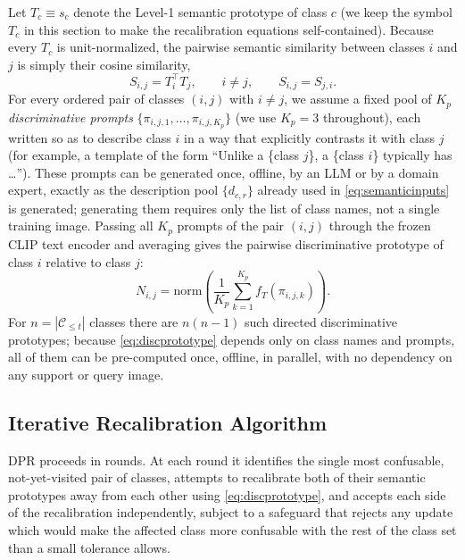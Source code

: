 \documentclass{iutbscthesis}
\begin{document}
Let $T_c \equiv s_c$ denote the Level-1 semantic prototype of class $c$ (we keep the symbol $T_c$ in this section to make the recalibration equations self-contained). Because every $T_c$ is unit-normalized, the pairwise semantic similarity between classes $i$ and $j$ is simply their cosine similarity,
\begin{equation}
    S_{i,j} = T_i^\top T_j, \qquad i \ne j, \qquad S_{i,j} = S_{j,i}.
    \label{eq:dprsim}
\end{equation}
For every ordered pair of classes $(i,j)$ with $i \ne j$, we assume a fixed pool of $K_p$ \emph{discriminative prompts} $\{\pi_{i,j,1}, \dots, \pi_{i,j,K_p}\}$ (we use $K_p = 3$ throughout), each written so as to describe class $i$ in a way that explicitly contrasts it with class $j$ (for example, a template of the form ``Unlike a \{class $j$\}, a \{class $i$\} typically has \dots''). These prompts can be generated once, offline, by an LLM or by a domain expert, exactly as the description pool $\{d_{c,r}\}$ already used in \autoref{eq:semanticinputs} is generated; generating them requires only the list of class names, not a single training image. Passing all $K_p$ prompts of the pair $(i,j)$ through the frozen CLIP text encoder and averaging gives the pairwise discriminative prototype of class $i$ relative to class $j$:
\begin{equation}
    N_{i,j} = \mathrm{norm}\!\left(\frac{1}{K_p}\sum_{k=1}^{K_p} f_T(\pi_{i,j,k})\right).
    \label{eq:discprototype}
\end{equation}
For $n = |\mathcal{C}_{\le t}|$ classes there are $n(n-1)$ such directed discriminative prototypes; because \autoref{eq:discprototype} depends only on class names and prompts, all of them can be pre-computed once, offline, in parallel, with no dependency on any support or query image.

\subsection{Iterative Recalibration Algorithm}

DPR proceeds in rounds. At each round it identifies the single most confusable, not-yet-visited pair of classes, attempts to recalibrate both of their semantic prototypes away from each other using \autoref{eq:discprototype}, and accepts each side of the recalibration independently, subject to a safeguard that rejects any update which would make the affected class more confusable with the rest of the class set than a small tolerance allows.
\end{document}
